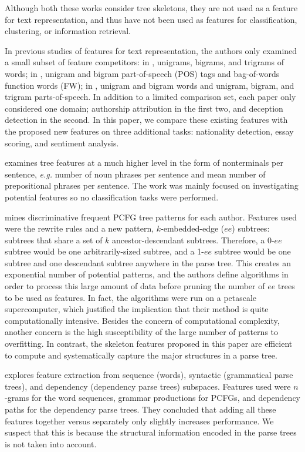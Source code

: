 \documentclass[conference]{IEEEtran}
\begin{document}
Although both these works consider tree skeletons, they are not used as a
feature for text representation, and thus have not been used as features for
classification, clustering, or information retrieval.

In previous studies of features for text representation, the authors only
examined a small subset of feature competitors: in \cite{acl-raghavan-2010},
unigrams, bigrams, and trigrams of words; in \cite{sigir-kim-2011}, unigram
and bigram part-of-speech (POS) tags and bag-of-words function words (FW); in
\cite{acl-feng-2012}, unigram and bigram words and unigram, bigram, and
trigram parts-of-speech.  In addition to a limited comparison set, each paper
only considered one domain; authorship attribution in the first two, and
deception detection in the second. In this paper, we compare these existing
features with the proposed new features on three additional tasks: nationality
detection, essay scoring, and sentiment analysis.

\cite{acl-chen-2011} examines tree features at a much higher level in the
form of nonterminals per sentence, \emph{e.g.} number of noun phrases per
sentence and mean number of prepositional phrases per sentence. The work was
mainly focused on investigating potential features so no classification tasks
were performed.

\cite{sigir-kim-2011} mines discriminative frequent PCFG tree patterns for
each author. Features used were the rewrite rules and a new pattern,
$k$-embedded-edge ($ee$) subtrees: subtrees that share a set of $k$
ancestor-descendant subtrees.  Therefore, a 0-$ee$ subtree would be one
arbitrarily-sized subtree, and a 1-$ee$ subtree would be one subtree and one
descendant subtree anywhere in the parse tree.  This creates an exponential
number of potential patterns, and the authors define algorithms in order to
process this large amount of data before pruning the number of $ee$ trees to be
used as features. In fact, the algorithms were run on a petascale supercomputer,
which justified the implication that their method is quite computationally
intensive. Besides the concern of computational complexity, another concern is
the high susceptibility of the large number of patterns to overfitting.  In
contrast,  the skeleton features proposed  in this paper are efficient to
compute and systematically capture the major structures in a parse tree. 

\cite{naacl-jiang-2007} explores feature extraction from sequence (words),
syntactic (grammatical parse trees), and dependency (dependency parse trees)
subspaces. Features used were $n$-grams for the word sequences, grammar
productions for PCFGs, and dependency paths for the dependency parse trees. They
concluded that adding all these features together versus separately only
slightly increases performance. We suspect that this is because the structural
information encoded in the parse trees is not taken into account.
\end{document}
